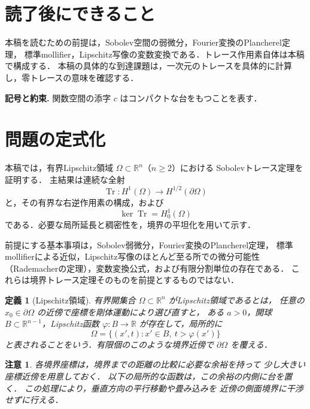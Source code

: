 \documentclass[a5paper,10pt,onecolumn]{jsarticle}
\theoremstyle{mathnotetheorem}
\newtheorem{definition}[theorem]{定義}
\newtheorem{remark}[theorem]{注意}
\begin{document}
\section*{読了後にできること}
本稿を読むための前提は，Sobolev空間の弱微分，Fourier変換のPlancherel定理，
標準mollifier，Lipschitz写像の変数変換である．トレース作用素自体は本稿で構成する．
本稿の具体的な到達課題は，一次元のトレースを具体的に計算し，零トレースの意味を確認する．


\par\noindent\textbf{記号と約束.}\quad
関数空間の添字 $c$ はコンパクトな台をもつことを表す．
\par

\section{問題の定式化}
本稿では，有界Lipschitz領域 $\Omega\subset\mathbb R^n$（$n\ge2$）における
Sobolevトレース定理を証明する．
主結果は連続な全射
\[
 \operatorname{Tr}:H^1(\Omega)\longrightarrow H^{1/2}(\partial\Omega)
\]
と，その有界な右逆作用素の構成，および
\[
 \ker\operatorname{Tr}=H_0^1(\Omega)
\]
である．必要な局所延長と稠密性を，境界の平坦化を用いて示す．

前提にする基本事項は，Sobolev弱微分，Fourier変換のPlancherel定理，
標準mollifierによる近似，Lipschitz写像のほとんど至る所での微分可能性
（Rademacherの定理），変数変換公式，および有限分割単位の存在である．
これらは境界トレース定理そのものを前提とするものではない．

\begin{definition}[Lipschitz領域]
有界開集合 $\Omega\subset\mathbb R^n$ がLipschitz領域であるとは，
任意の $x_0\in\partial\Omega$ の近傍で座標を剛体運動により選び直すと，
ある $a>0$，開球 $B\subset\mathbb R^{n-1}$，Lipschitz函数
$\varphi:B\to\mathbb R$ が存在して，局所的に
\[
 \Omega=\{(x',t):x'\in B,\ t>\varphi(x')\}
\]
と表されることをいう．有限個のこのような境界近傍で
$\partial\Omega$ を覆える．
\end{definition}

\begin{remark}
各境界座標は，境界までの距離の比較に必要な余裕を持って
少し大きい座標近傍を用意しておく．
以下の局所的な函数は，この余裕の内側に台を置く．
この処理により，垂直方向の平行移動や畳み込みを
近傍の側面境界に干渉せずに行える．
\end{remark}
\end{document}
